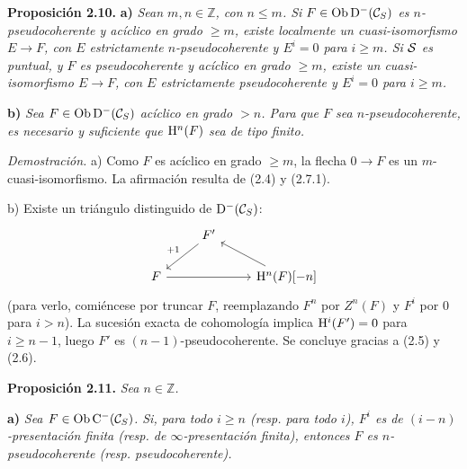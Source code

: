 \textbf{Proposición 2.10.} \textbf{a)} \emph{Sean \(m,n\in\mathbb Z\), con \(n\leq m\). Si \(F\in\Ob\Dpx^-(\mathcal C_S)\) es \(n\)-pseudocoherente y acíclico en grado \(\geq m\), existe localmente un cuasi-isomorfismo \(E\longrightarrow F\), con \(E\) estrictamente \(n\)-pseudocoherente y \(E^i=0\) para \(i\geq m\). Si \(\sisi{S}{\mathcal S}\) es puntual, y \(F\) es pseudocoherente y acíclico en grado \(\geq m\), existe un cuasi-isomorfismo \(E\longrightarrow F\), con \(E\) estrictamente pseudocoherente y \(E^i=0\) para \(i\geq m\).}

\textbf{b)} \emph{Sea \(F\in\Ob\Dpx^-(\mathcal C_S)\) acíclico en grado \(>n\). Para que \(F\) sea \(n\)-pseudocoherente, es necesario y suficiente que \(\Ho^n(F)\) sea de tipo finito.}

\emph{Demostración.} a) Como \(F\) es acíclico en grado \(\geq m\), la flecha \(0\to F\) es un \(m\)-cuasi-isomorfismo. La afirmación resulta de (2.4) y (2.7.1).

b) Existe un triángulo distinguido de \(\Dpx^-(\mathcal C_S)\):
\[
\begin{tikzcd}
& F' \arrow[dl,"+1"'] & \\
F \arrow[rr] && \Ho^n(F)[-n] \arrow[ul]
\end{tikzcd}
\]
(para verlo, comiéncese por truncar \(F\), reemplazando \(F^n\) por \(Z^n(F)\) y \(F^i\) por \(0\) para \(i>n\)). La sucesión exacta de cohomología implica \(\Ho^i(F')=0\) para \(i\geq n-1\), luego \(F'\) es \((n-1)\)-pseudocoherente. Se concluye gracias a (2.5) y (2.6).



\providecommand{\RHom}{\mathrm R\!\Hom}
\providecommand{\Ext}{\operatorname{Ext}}
\providecommand{\coh}{\operatorname{coh}}
\providecommand{\PreCoh}{\operatorname{precoh}}
\providecommand{\Tr}{\operatorname{Tr}}
\providecommand{\Qis}{\operatorname{Qis}}
\providecommand{\Rad}{\operatorname{rad}}
\providecommand{\Spec}{\operatorname{Spec}}
\providecommand{\End}{\operatorname{End}}
\providecommand{\Id}{\operatorname{Id}}
\providecommand{\varinjlim}{\mathop{\mathrm{lim}}\limits_{\longrightarrow}}
\providecommand{\varprojlim}{\mathop{\mathrm{lim}}\limits_{\longleftarrow}}
\providecommand{\qcoh}{\operatorname{qcoh}}
\providecommand{\amp}{\operatorname{amp}}


\textbf{Proposición 2.11.} \emph{Sea \(n\in\mathbb Z\).}

\textbf{a)} \emph{Sea \(F\in\Ob\Cpx^-(\mathcal C_S)\). Si, para todo \(i\geq n\) (resp. para todo \(i\)), \(F^i\) es de \((i-n)\)-presentación finita (resp. de \(\infty\)-presentación finita), entonces \(F\) es \(n\)-pseudocoherente (resp. pseudocoherente).}

